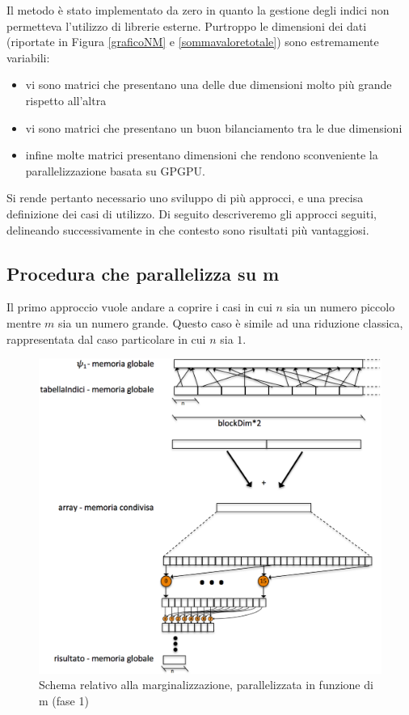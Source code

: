 \documentclass[a4paper]{article}   %
\begin{document}
Il metodo è stato implementato da zero in quanto la gestione degli indici non permetteva l’utilizzo di librerie esterne.
Purtroppo le dimensioni dei dati (riportate in Figura \ref{graficoNM} e \ref{sommavaloretotale}) sono estremamente variabili: 
\begin{itemize}
\item vi sono matrici che presentano una delle due dimensioni molto più grande rispetto all’altra
\item vi sono matrici che presentano un buon bilanciamento tra le due dimensioni
\item infine molte matrici presentano dimensioni che rendono sconveniente la parallelizzazione basata su GPGPU.
\end{itemize}
Si rende pertanto necessario uno sviluppo di più approcci, e una precisa definizione dei casi di utilizzo. Di seguito descriveremo gli approcci seguiti, delineando successivamente in che contesto sono risultati più vantaggiosi.

\subsection{Procedura che parallelizza su m}
Il primo approccio vuole andare a coprire i casi in cui $n$ sia un numero piccolo mentre $m$ sia un numero grande. Questo caso è simile ad una riduzione classica, rappresentata dal caso particolare in cui $n$ sia $1$.

 \begin{figure}[!h]
\centering
\includegraphics[scale=0.25]{relazionecentrata.png}
\caption{Schema relativo alla marginalizzazione, parallelizzata in funzione di m (fase 1) }
\label{schemafase1}
\end{figure}
\end{document}
